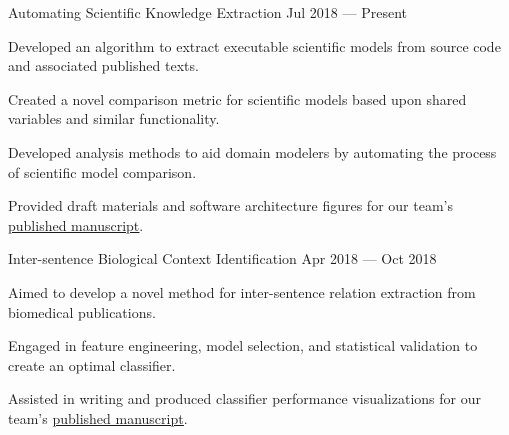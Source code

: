 
\vspace{-0.2cm}

\begin{cventries}


  \cventry
    {} %
    {Automating Scientific Knowledge Extraction} %
    {Jul 2018 --- Present} %
    {} %
    {
      \vspace{-0.5cm}
      \begin{cvitems} %
        \item Developed an algorithm to extract executable scientific models from source code and associated published texts.
        \item Created a novel comparison metric for scientific models based upon shared variables and similar functionality.
        \item Developed analysis methods to aid domain modelers by automating the process of scientific model comparison.
        \item Provided draft materials and software architecture figures for our team's \href{https://arxiv.org/abs/2001.07295}{\underline{published manuscript}}.
      \end{cvitems}
    }

  \cventry
    {} %
    {Inter-sentence Biological Context Identification} %
    {Apr 2018 --- Oct 2018} %
    {} %
    {
      \vspace{-0.5cm}
      \begin{cvitems} %
        \item Aimed to develop a novel method for inter-sentence relation extraction from biomedical publications.
        \item Engaged in feature engineering, model selection, and statistical validation to create an optimal classifier.
        \item Assisted in writing and produced classifier performance visualizations for our team's \href{https://arxiv.org/abs/1812.06199}{\underline{published manuscript}}.
      \end{cvitems}
    }


\end{cventries}
